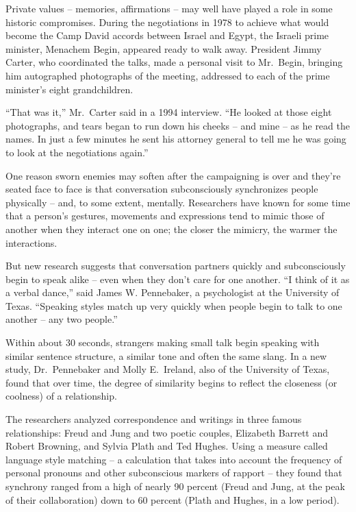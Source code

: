 ﻿\documentclass[12pt]{article}
\begin{document}
Private values -- memories, affirmations -- may well have played a role in some historic
compromises. During the negotiations in 1978 to achieve what would become the Camp David accords
between Israel and Egypt, the Israeli prime minister, Menachem Begin, appeared ready to walk away.
President Jimmy Carter, who coordinated the talks, made a personal visit to Mr.~Begin, bringing him
autographed photographs of the meeting, addressed to each of the prime minister's eight
grandchildren.

``That was it,'' Mr.~Carter said in a 1994 interview. ``He looked at those eight photographs, and
tears began to run down his cheeks -- and mine -- as he read the names. In just a few minutes he
sent his attorney general to tell me he was going to look at the negotiations again.''

One reason sworn enemies may soften after the campaigning is over and they're seated face to face is
that conversation subconsciously synchronizes people physically -- and, to some extent, mentally.
Researchers have known for some time that a person's gestures, movements and expressions tend to
mimic those of another when they interact one on one; the closer the mimicry, the warmer the
interactions.

But new research suggests that conversation partners quickly and subconsciously begin to speak alike
-- even when they don't care for one another. ``I think of it as a verbal dance,'' said James W.
Pennebaker, a psychologist at the University of Texas. ``Speaking styles match up very quickly when
people begin to talk to one another -- any two people.''

Within about 30 seconds, strangers making small talk begin speaking with similar sentence structure,
a similar tone and often the same slang. In a new study, Dr.~Pennebaker and Molly E.~Ireland, also
of the University of Texas, found that over time, the degree of similarity begins to reflect the
closeness (or coolness) of a relationship.

The researchers analyzed correspondence and writings in three famous relationships: Freud and Jung
and two poetic couples, Elizabeth Barrett and Robert Browning, and Sylvia Plath and Ted Hughes.
Using a measure called language style matching -- a calculation that takes into account the
frequency of personal pronouns and other subconscious markers of rapport -- they found that
synchrony ranged from a high of nearly 90 percent (Freud and Jung, at the peak of their
collaboration) down to 60 percent (Plath and Hughes, in a low period).
\end{document}
